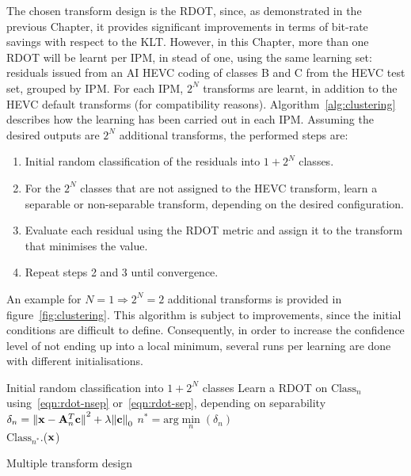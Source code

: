 \documentclass[11pt,a4paper,openright,twoside]{book}
\numberwithin{equation}{section} %
\numberwithin{figure}{section} %
\numberwithin{table}{section} %
\begin{document}
The chosen transform design is the \ac{RDOT}, since, as demonstrated in the
previous Chapter, it provides significant improvements in terms of bit-rate
savings with respect to the \ac{KLT}.
However, in this Chapter, more than one \ac{RDOT} will be learnt per \ac{IPM},
in stead of one, using the same learning set:
residuals issued from an \ac{AI} \ac{HEVC} coding of classes B and C from the
\ac{HEVC} test set, grouped by \ac{IPM}.
For each \ac{IPM}, $2^N$ transforms are learnt, in addition to the \ac{HEVC}
default transforms (for compatibility reasons).
Algorithm~\ref{alg:clustering} describes how the learning has been carried out
in each \ac{IPM}.
Assuming the desired outputs are $2^N$ additional transforms, the performed
steps are:
\begin{enumerate}
	\item Initial random classification of the residuals into $1+2^N$ classes.
	\item For the $2^N$ classes that are not assigned to the \ac{HEVC}
		transform, learn a separable or non-separable transform, depending on
		the desired configuration.
	\item Evaluate each residual using the RDOT metric and assign it to the
		transform that minimises the value.
	\item Repeat steps 2 and 3 until convergence.
\end{enumerate}
An example for $N=1\Rightarrow2^N=2$ additional transforms is provided in
figure~\ref{fig:clustering}.
This algorithm is subject to improvements, since the initial conditions are
difficult to define.
Consequently, in order to increase the confidence level of not ending up into
a local minimum, several runs per learning are done with different
initialisations.

\begin{algorithm}
	\small
	\BlankLine%
	Initial random classification into $1+2^N$ classes
	\BlankLine%
	{
			{
				Learn a \ac{RDOT} on $\text{Class}_n$
				using~\eqref{eqn:rdot-nsep} or~\eqref{eqn:rdot-sep}, depending
				on separability
			}
			{
				{
					$\delta_n =
					{\Vert \mathbf{x} - \mathbf{A}^T_n\mathbf{c}\Vert}^2 + \lambda{\Vert\mathbf{c}\Vert}_0$
				}
				$\displaystyle n^* = \text{arg}\min\limits_n(\delta_n)$\\
				$\text{Class}_{n^*}$.\append($\mathbf{x}$)
			}
	}
	\caption{Multiple transform design}
	\label{alg:clustering}
\end{algorithm}
\end{document}
